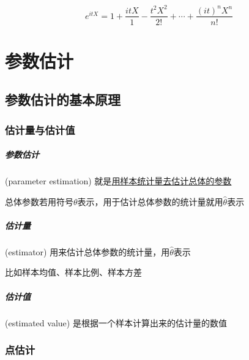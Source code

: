 \documentclass[UTF8,10pt]{book}
\begin{document}
	$$ e^{i t X}=1+\frac{i t X}{1}-\frac{t^{2} X^{2}}{2 !}+\cdots+\frac{(i t)^{n} X^{n}}{n !} $$
	
	
	
\chapter{参数估计}

    \section{参数估计的基本原理}
        \subsection{估计量与估计值}

            \paragraph{参数估计} (parameter estimation) 就是\underline{用样本统计量去估计总体的参数}

            {\kaishu 总体参数若用符号$\theta$表示，用于估计总体参数的统计量就用$\hat{\theta}$表示}

            \paragraph{估计量} (estimator) 用来估计总体参数的统计量，用$\hat{\theta}$表示

            {\kaishu 比如样本均值、样本比例、样本方差}

            \paragraph{估计值} (estimated value) 是根据一个样本计算出来的估计量的数值

        \subsection{点估计}
\end{document}
